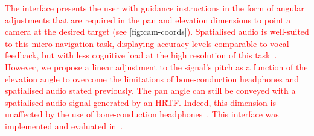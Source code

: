 \documentclass[acmsmall]{acmart}
\newcommand\hl[1]{\textcolor{red}{#1}}
\begin{document}
\hl{The interface presents the user with guidance instructions in the form of angular adjustments that are required in the pan and elevation dimensions to point a camera at the desired target (see \cref{fig:cam-coords}).
Spatialised audio is well-suited to this micro-navigation task, displaying accuracy levels comparable to vocal feedback, but with less cognitive load at the high resolution of this task~\citep{klatzky2006cognitive}. 
However, we propose a linear adjustment to the signal's pitch as a function of the elevation angle to overcome the limitations of bone-conduction headphones and spatialised audio stated previously.
The pan angle can still be conveyed with a spatialised audio signal generated by an HRTF.
Indeed, this dimension is unaffected by the use of bone-conduction headphones~\citep{schonstein2008comparison,macdonald2006spatial,stanley2006lateralization,lock2019bone}. 
This interface was implemented and evaluated in~\citet{lock2019bone}.}


\end{document}
